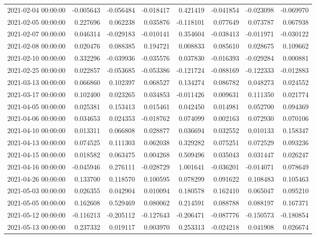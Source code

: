 \begin{tabular}{lrrrrrrr}
2021-02-04 00:00:00 & -0.005643 & -0.056484 & -0.018417 & 0.421419 & -0.041854 & -0.023098 & -0.069970 \\
2021-02-05 00:00:00 & 0.227696 & 0.062238 & 0.035876 & -0.118101 & 0.077649 & 0.073787 & 0.067938 \\
2021-02-07 00:00:00 & 0.046314 & -0.029183 & -0.010141 & 0.354604 & -0.038413 & -0.011971 & -0.030122 \\
2021-02-08 00:00:00 & 0.020476 & 0.088385 & 0.194721 & 0.008833 & 0.085610 & 0.028675 & 0.109662 \\
2021-02-10 00:00:00 & 0.332296 & -0.039936 & -0.035576 & 0.037830 & -0.016393 & -0.029284 & 0.000881 \\
2021-02-25 00:00:00 & 0.022857 & -0.053685 & -0.053386 & -0.121724 & -0.088169 & -0.122333 & -0.012883 \\
2021-03-13 00:00:00 & 0.066860 & 0.102397 & 0.068527 & 0.134274 & 0.086782 & 0.048273 & 0.024552 \\
2021-03-17 00:00:00 & 0.102400 & 0.023265 & 0.034853 & -0.011426 & 0.009631 & 0.111350 & 0.021774 \\
2021-04-05 00:00:00 & 0.025381 & 0.153413 & 0.015461 & 0.042450 & 0.014981 & 0.052700 & 0.094369 \\
2021-04-06 00:00:00 & 0.034653 & 0.024353 & -0.018762 & 0.074099 & 0.002163 & 0.072930 & 0.070106 \\
2021-04-10 00:00:00 & 0.013311 & 0.066808 & 0.028877 & 0.036694 & 0.032552 & 0.010133 & 0.158347 \\
2021-04-13 00:00:00 & 0.074525 & 0.111303 & 0.062038 & 0.329282 & 0.075251 & 0.072529 & 0.093236 \\
2021-04-15 00:00:00 & 0.018582 & 0.063475 & 0.004268 & 0.509496 & 0.035043 & 0.031447 & 0.026247 \\
2021-04-16 00:00:00 & -0.045946 & 0.276111 & -0.028729 & 1.001641 & -0.036201 & -0.014071 & 0.078649 \\
2021-04-26 00:00:00 & 0.133700 & 0.118570 & 0.100595 & 0.078299 & 0.091622 & 0.108483 & 0.105463 \\
2021-05-03 00:00:00 & 0.026355 & 0.042904 & 0.010094 & 0.180578 & 0.162410 & 0.065047 & 0.095210 \\
2021-05-05 00:00:00 & 0.162608 & 0.529469 & 0.080062 & 0.214591 & 0.088788 & 0.088197 & 0.167371 \\
2021-05-12 00:00:00 & -0.116213 & -0.205112 & -0.127643 & -0.206471 & -0.087776 & -0.150573 & -0.180854 \\
2021-05-13 00:00:00 & 0.237332 & 0.019117 & 0.003970 & 0.253313 & -0.024218 & 0.041908 & 0.026674 \\

\end{tabular}
